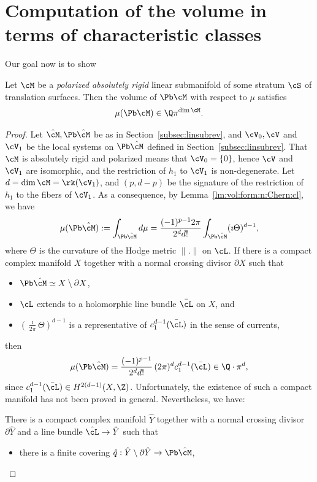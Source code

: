 \section{Computation of the volume in terms of characteristic classes}\label{sec:rational:vol}
Our goal now is to show
\begin{Theorem}\label{th:vol:rational}
Let $\cM$ be a \emph{polarized absolutely rigid} linear submanifold of some stratum $\cS$ of translation surfaces.
Then the volume of $\Pb\cM$ with respect to $\mu$ satisfies
\[
\mu(\Pb\cM)\in \Q\pi^{\dim\cM}.
\]
\end{Theorem}
\begin{proof}
Let $\hat{\cM}, \Pb\hat{\cM}$ be as in Section~\ref{subsec:linsubrev}, and $\cV_0, \cV$ and $\cV_1$ be the local systems on $\Pb\hat\cM$ defined in Section~\ref{subsec:linsubrev}.
That $\cM$ is absolutely rigid and polarized means that $\cV_0=\{0\}$, hence $\cV$ and $\cV_1$ are isomorphic, and the restriction of $h_1$ to $\cV_1$ is non-degenerate. Let $d=\dim\cM=\rk(\cV_1)$, and $(p,d-p)$ be the signature of the restriction of $h_1$ to the fibers of $\cV_1$. As a consequence, by Lemma~\ref{lm:vol:form:n:Chern:cl}, we have
\[
\mu(\Pb\hat{\cM}):=\int_{\Pb\hat{\cM}}d\mu=\frac{(-1)^{p-1}2\pi}{2^dd!}\int_{\Pb\hat{\cM}}(\imath\Theta)^{d-1},
\]
where $\Theta$ is the curvature of the Hodge metric $\|.\|$ on $\cL$. If there is a compact complex manifold $X$ together with a normal crossing divisor $\partial X$ such that
\begin{itemize}
\item $\Pb\hat{\cM}\simeq X\setminus \partial X$,

\item $\cL$ extends to a holomorphic line bundle $\bar{\cL}$ on $X$, and

\item $(\frac{\imath}{2\pi}\Theta)^{d-1}$ is a representative of $c_1^{d-1}(\bar{\cL})$ in the sense of currents,
\end{itemize}
then
\[
\mu(\Pb\hat{\cM})=\frac{(-1)^{p-1}}{2^dd!}\,(2\pi)^{d}c_1^{d-1}(\bar{\cL}) \in \Q\cdot\pi^d,
\]
since $c_1^{d-1}(\bar{\cL}) \in H^{2(d-1)}(X,\Z)$.
Unfortunately, the existence of such a compact manifold has not been proved in general.
Nevertheless, we have:
\begin{Claim}\label{cl:vol:Chern:cls}
There is a compact complex manifold $\hat{Y}$ together with a normal crossing divisor $\partial \hat{Y}$ and a line bundle $\hat{\cL}\to \hat{Y}$ such that
\begin{itemize}
\item there is a finite covering $\hat{q}: \hat{Y}\setminus\partial \hat{Y} \to \Pb\hat{\cM}$,


\end{itemize}
\end{Claim}
\end{proof}
